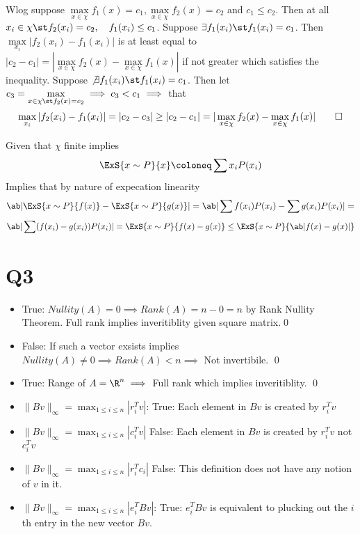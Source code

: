 \documentclass[12pt]{amsart}
\begin{document}
  \begin{problem}
    Wlog suppose $\max\limits_{x\in\chi}f_1(x)=c_1, \max\limits_{x\in\chi}f_2(x)=c_2$ and $c_1\leq c_2$. Then at all $x_i\in\chi\st f_2(x_i)=c_2,\quad f_1(x_i) \leq c_1$. Suppose $\exists f_1(x_i) \st f_1(x_i)=c_1$. Then $\max\limits_{x_i}|f_2(x_i)-f_1(x_i)|$ is at least equal to $|c_2-c_1| = |\max\limits_{x\in\chi}f_2(x)-\max\limits_{x\in\chi}f_1(x)|$ if not greater which satisfies the inequality. Suppose $\not\exists f_1(x_i)\st f_1(x_i)=c_1$. Then let $c_3 = \max\limits_{x\in\chi\st f_2(x)=c_2}\implies c_3 < c_1 \implies$ that 
    \[ \max\limits_{x_i}|f_2(x_i)-f_1(x_i)| = |c_2-c_3| \geq |c_2 -c_1| = |\max\limits_{x\in\chi}f_2(x)-\max\limits_{x\in\chi}f_1(x)| \qed \]
  \end{problem}

  \begin{problem}
    Given that $\chi$ finite implies 
    \[\ExS{x\sim P}{x} \coloneq \sum x_iP(x_i)\]
    Implies that by nature of expecation linearity 
    \[\ab|\ExS{x\sim P}{f(x)}-\ExS{x\sim P}{g(x)}| = \ab|\sum f(x_i)P(x_i) - \sum g(x_i)P(x_i)| =\]
    \[\ab|\sum (f(x_i)-g(x_i))P(x_i)| = \ExS{x\sim P}{f(x)-g(x)} \leq \ExS{x\sim P}{\ab|f(x)-g(x)|}\]
  \end{problem}

  \section{Q3}
  \begin{problem}
    \begin{itemize}
      \item True: $Nullity(A)=0 \implies Rank(A)=n-0=n$ by Rank Nullity Theorem. Full rank implies inveritiblity given square matrix.\qed
      \item False: If such a vector exsists implies $Nullity(A) \neq 0 \implies Rank(A) < n \implies$ Not invertibile. \qed 
      \item True: Range of $A=\R^n\implies$ Full rank which implies inveritiblity. \qed
    \end{itemize}
  \end{problem}
  
  \begin{problem}
    \begin{itemize}
    \item $\|Bv\|_\infty = \max_{1\leq i\leq n}|r_i^Tv|$:
      True: Each element in $Bv$ is created by $r_i^Tv$
    \item $\|Bv\|_\infty = \max_{1\leq i\leq n}|c_i^Tv|$ 
      False: Each element in $Bv$ is created by $r_i^Tv$ not $c_i^Tv$
    \item $\|Bv\|_\infty = \max_{1\leq i\leq n}|r_i^Tc_i|$ 
      False: This definition does not have any notion of $v$ in it.
    \item $\|Bv\|_\infty = \max_{1\leq i\leq n}|e_i^TBv|$:
      True: $e_i^TBv$ is equivalent to plucking out the $i$th entry in the new vector $Bv$.
    \end{itemize}
  \end{problem}
\end{document}
